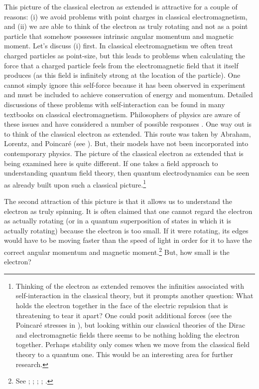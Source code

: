 \documentclass[12pt,secnumarabic,amsmath,amssymb,balancelastpage,nofootinbib]{article}
\begin{document}
This picture of the classical electron as extended is attractive for a couple of reasons: (i) we avoid problems with point charges in classical electromagnetism, and (ii) we are able to think of the electron as truly rotating and not as a point particle that somehow possesses intrinsic angular momentum and magnetic moment.  Let's discuss (i) first.  In classical electromagnetism we often treat charged particles as point-size, but this leads to problems when calculating the force that a charged particle feels from the electromagnetic field that it itself produces (as this field is infinitely strong at the location of the particle).  One cannot simply ignore this self-force because it has been observed in experiment and must be included to achieve conservation of energy and momentum.  Detailed discussions of these problems with self-interaction can be found in many textbooks on classical electromagnetism.  Philosophers of physics are aware of these issues and have considered a number of possible responses \citep{lange, frisch2005, lazarovici2018, maudlin2018, hartensteinhubert}.  One way out is to think of the classical electron as extended.  This route was taken by Abraham, Lorentz, and Poincar\'{e} (see \citealp{pearle}).  But, their models have not been incorporated into contemporary physics.  The picture of the classical electron as extended that is being examined here is quite different.  If one takes a field approach to understanding quantum field theory, then quantum electrodynamics can be seen as already built upon such a classical picture.\footnote{Thinking of the electron as extended removes the infinities associated with self-interaction in the classical theory, but it prompts another question: What holds the electron together in the face of the electric repulsion that is threatening to tear it apart?  One could posit additional forces (see the Poincar\'{e} stresses in \citealp[ch.\ 16]{jackson}), but looking within our classical theories of the Dirac and electromagnetic fields there seems to be nothing holding the electron together.  Perhaps stability only comes when we move from the classical field theory to a quantum one.  This would be an interesting area for further research.}

The second attraction of this picture is that it allows us to understand the electron as truly spinning.  It is often claimed that one cannot regard the electron as actually rotating (or in a quantum superposition of states in which it is actually rotating) because the electron is too small.  If it were rotating, its edges would have to be moving faster than the speed of light in order for it to have the correct angular momentum and magnetic moment.\footnote{See \citet[pg.\ 47]{uhlenbeck}; \citet[pg.\ 35]{tomonaga}; \citet[problem 4.25]{griffithsQM}; \citet[pg.\ 127]{rohrlich}; \citet[sec.\ 2]{howelectronsspin}.}  But, how small is the electron?
\end{document}
